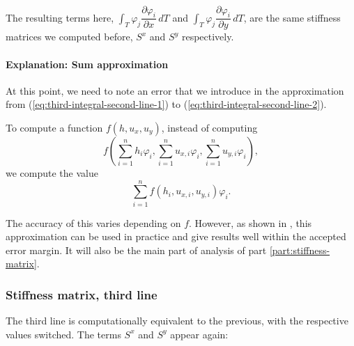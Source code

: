 \documentclass{article}
\newcommand{\pd}[2]{\dfrac{\partial #1}{\partial #2}}
\renewcommand{\phi}{\varphi}
\begin{document}
\begin{eqnarray}
\end{eqnarray}

The resulting terms here, $\int_T \phi_j \pd{\phi_i}{x} \, dT$ and $\int_T \phi_j \pd{\phi_i}{y} \, dT$, are the same stiffness matrices we computed before, $S^x$ and $S^y$ respectively.

\paragraph{Explanation: Sum approximation}
\label{par:sum-approx}

At this point, we need to note an error that we introduce in the approximation from (\ref{eq:third-integral-second-line-1}) to (\ref{eq:third-integral-second-line-2}).

To compute a function $f(h, u_x, u_y)$, instead of computing
\begin{equation*}
  f\left(\sum_{i=1}^n h_i \phi_i,
    \sum_{i=1}^n u_{x,i} \phi_i,
    \sum_{i=1}^n u_{y,i} \phi_i\right),
\end{equation*}
we compute the value
\begin{equation*}
  \sum_{i=1}^n f(h_i,u_{x,i},u_{y,i}) \phi_i.
\end{equation*}

The accuracy of this varies depending on $f$. However, as shown in \cite{cockburn1999discontinuous}, this approximation can be used in practice and give results well within the accepted error margin. It will also be the main part of analysis of part \ref{part:stiffness-matrix}.

\subsubsection{Stiffness matrix, third line}

The third line is computationally equivalent to the previous, with the respective values switched. The terms $S^x$ and $S^y$ appear again:
\end{document}
